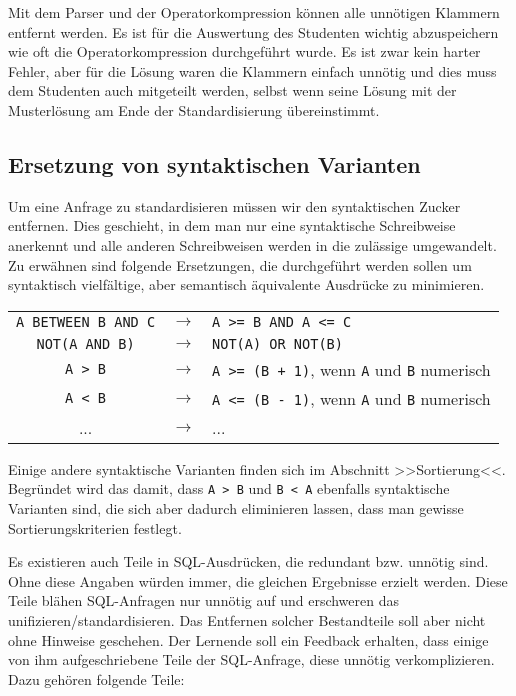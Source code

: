 Mit dem Parser und der Operatorkompression können alle unnötigen Klammern entfernt werden. Es ist für die Auswertung des Studenten wichtig abzuspeichern wie oft die Operatorkompression durchgeführt wurde. Es ist zwar kein harter Fehler, aber für die Lösung waren die Klammern einfach unnötig und dies muss dem Studenten auch mitgeteilt werden, selbst wenn seine Lösung mit der Musterlösung am Ende der Standardisierung übereinstimmt.

\subsection{Ersetzung von syntaktischen Varianten}

Um eine Anfrage zu standardisieren müssen wir den syntaktischen Zucker entfernen. Dies geschieht, in dem man nur eine syntaktische Schreibweise anerkennt und alle anderen Schreibweisen werden in die zulässige umgewandelt. Zu erwähnen sind folgende Ersetzungen, die durchgeführt werden sollen um syntaktisch vielfältige, aber semantisch äquivalente Ausdrücke zu minimieren.

\begin{tabular}{ccl}
\verb|A BETWEEN B AND C| & $\to$  & \verb|A >= B AND A <= C|\\
\verb|NOT(A AND B)| & $\to$  & \verb|NOT(A) OR NOT(B)|\\
\verb|A > B| & $\to$  & \verb|A >= (B + 1)|, wenn \verb|A| und \verb|B| numerisch\\
\verb|A < B| & $\to$  & \verb|A <= (B - 1)|, wenn \verb|A| und \verb|B| numerisch\\
... & $\to$ & ...\\
\end{tabular}

Einige andere syntaktische Varianten finden sich im Abschnitt >>Sortierung<<. Begründet wird das damit, dass \verb|A > B| und \verb|B < A| ebenfalls syntaktische Varianten sind, die sich aber dadurch eliminieren lassen, dass man gewisse Sortierungskriterien festlegt.

Es existieren auch Teile in SQL-Ausdrücken, die redundant bzw. unnötig sind. Ohne diese Angaben würden immer, die gleichen Ergebnisse erzielt werden. Diese Teile blähen SQL-Anfragen nur unnötig auf und erschweren das unifizieren/standardisieren. Das Entfernen solcher Bestandteile soll aber nicht ohne Hinweise geschehen. Der Lernende soll ein Feedback erhalten, dass einige von ihm aufgeschriebene Teile der SQL-Anfrage, diese unnötig verkomplizieren. Dazu gehören folgende Teile:

